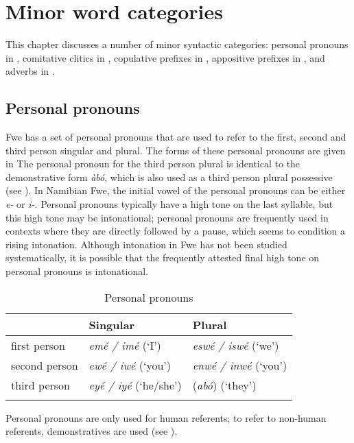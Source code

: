 \chapter{Minor word categories}\largerpage
\hypertarget{Toc75352651}{}
This chapter discusses a number of minor syntactic categories: personal pronouns in , comitative clitics in , copulative prefixes in , appositive prefixes in , and adverbs in .

\section{Personal pronouns}
\label{bkm:Ref488767962}\hypertarget{Toc75352652}{}
Fwe has a set of personal pronouns that are used to refer to the first, second and third person singular and plural. The forms of these personal pronouns are given in  The personal pronoun for the third person plural is identical to the demonstrative form \textit{àbó}, which is also used as a third person plural possessive (see ). In Namibian Fwe, the initial vowel of the personal pronouns can be either \textit{e-} or \textit{i-}. Personal pronouns typically have a high tone on the last syllable, but this high tone may be intonational; personal pronouns are frequently used in contexts where they are directly followed by a pause, which seems to condition a rising intonation. Although intonation in Fwe has not been studied systematically, it is possible that the frequently attested final high tone on personal pronouns is intonational.

\begin{table}
\label{bkm:Ref463366758}\caption{\label{tab:5:1}Personal pronouns}
\begin{tabular}{lll}
\lsptoprule
& Singular & Plural\\
\midrule
first person & \textit{emé / imé} (‘I’) & \textit{eswé / iswé} (‘we’)\\
second person & \textit{ewé / iwé} (‘you’) & \textit{enwé / inwé} (‘you’)\\
third person & \textit{eyé / iyé} (‘he/she’) & (\textit{abó}) (‘they’)\\
\lspbottomrule
\end{tabular}
\end{table}

Personal pronouns are only used for human referents; to refer to non-human referents, demonstratives are used (see ).


